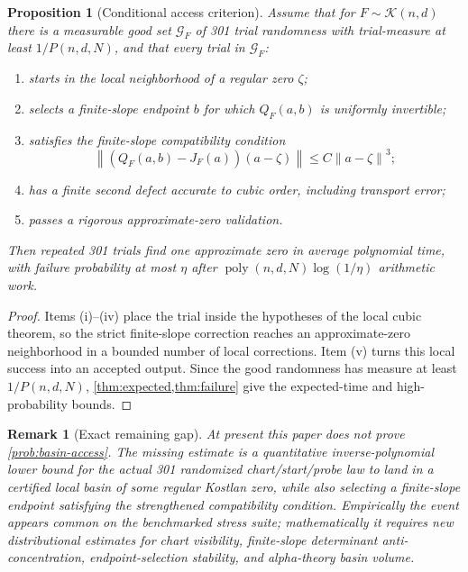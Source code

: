 \documentclass[11pt]{article}
\newtheorem{proposition}[definition]{Proposition}
\newtheorem{remark}[definition]{Remark}
\newcommand{\K}{\mathcal K}
\newcommand{\poly}{\operatorname{poly}}
\newcommand{\norm}[1]{\left\lVert #1\right\rVert}
\begin{document}
\begin{proposition}[Conditional access criterion]\label{prop:conditional-access}
Assume that for $F\sim\K(n,d)$ there is a measurable good set $\mathcal G_F$ of 301 trial randomness with trial-measure at least $1/P(n,d,N)$, and that every trial in $\mathcal G_F$:
\begin{enumerate}[label=(\roman*)]
\item starts in the local neighborhood of a regular zero $\zeta$;
\item selects a finite-slope endpoint $b$ for which $Q_F(a,b)$ is uniformly invertible;
\item satisfies the finite-slope compatibility condition
\[
        \norm{(Q_F(a,b)-J_F(a))(a-\zeta)}\le C\norm{a-\zeta}^3;
\]
\item has a finite second defect accurate to cubic order, including transport error;
\item passes a rigorous approximate-zero validation.
\end{enumerate}
Then repeated 301 trials find one approximate zero in average polynomial time, with failure probability at most $\eta$ after $\poly(n,d,N)\log(1/\eta)$ arithmetic work.
\end{proposition}

\begin{proof}
Items (i)--(iv) place the trial inside the hypotheses of the local cubic theorem, so the strict finite-slope correction reaches an approximate-zero neighborhood in a bounded number of local corrections.  Item (v) turns this local success into an accepted output.  Since the good randomness has measure at least $1/P(n,d,N)$, \cref{thm:expected,thm:failure} give the expected-time and high-probability bounds.
\end{proof}

\begin{remark}[Exact remaining gap]
At present this paper does not prove \cref{prob:basin-access}.  The missing estimate is a quantitative inverse-polynomial lower bound for the actual 301 randomized chart/start/probe law to land in a certified local basin of some regular Kostlan zero, while also selecting a finite-slope endpoint satisfying the strengthened compatibility condition.  Empirically the event appears common on the benchmarked stress suite; mathematically it requires new distributional estimates for chart visibility, finite-slope determinant anti-concentration, endpoint-selection stability, and alpha-theory basin volume.
\end{remark}
\end{document}
